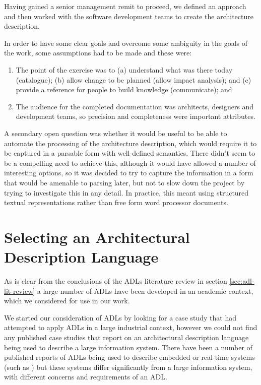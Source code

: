   Having gained a senior management remit to proceed, we defined an approach and then worked with the software development teams to create the architecture description.

  In order to have some clear goals and overcome some ambiguity in the goals of the work, some assumptions had to be made and these were:

 \begin{enumerate}

\item The point of the exercise was to (a) understand what was there today (catalogue); (b) allow change to be planned (allow impact analysis); and (c) provide a reference for people to build knowledge (communicate); and

\item The audience for the completed documentation was architects, designers and development teams, so precision and completeness were important attributes.

\end{enumerate}

  A secondary open question was whether it would be useful to be able to automate the processing of the architecture description, which would require it to be captured in a parsable form with well-defined semantics.  There didn't seem to be a compelling need to achieve this, although it would have allowed a number of interesting options, so it was decided to try to capture the information in a form that would be amenable to parsing later, but not to slow down the project by trying to investigate this in any detail.  In practice, this meant using structured textual representations rather than free form word processor documents.

\section{Selecting an Architectural Description Language}

  As is clear from the conclusions of the ADLs literature review in section \ref{sec:adl-lit-review} a large number of ADLs have been developed in an academic context, which we considered for use in our work.

  We started our consideration of ADLs by looking for a case study that had attempted to apply ADLs in a large industrial context, however we could not find any published case studies that report on an architectural description language being used to describe a large information system. There have been a number of published reports of ADLs being used to describe embedded or real-time systems (such as \cite{feiler2000-realtime,lonn2004-east}) but these systems differ significantly from a large information system, with different concerns and requirements of an ADL.

